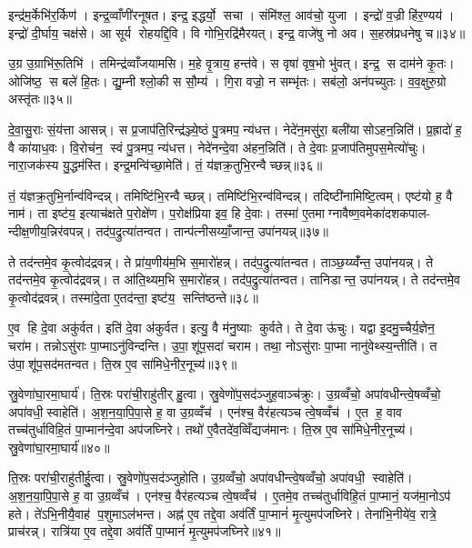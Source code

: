 इन्द्र॑म॒र्केभि॑र॒र्किण॑। इन्द्र॒व्वाँणी॑रनूषत। इन्द्र॒ इद्धर्यो॒ सचा। संमि॑श्ल॒ आव॑चो॒ युजा। इन्द्रो॑ व॒ज्री हि॑र॒ण्यय॑। इन्द्रो॑ दी॒र्घाय॒ चक्ष॑से। आ सूर्य रोहयद्दि॒वि। वि गोभि॒रद्रि॑मैरयत्। इन्द्र॒ वाजे॑षु नो अव। स॒हस्र॑प्रधनेषु च॥३४॥

उ॒ग्र उ॒ग्राभि॑रू॒तिभि॑। तमिन्द्र॑व्वाँजयामसि। म॒हे वृ॒त्राय॒ हन्त॑वे। स वृषा॑ वृष॒भो भु॑वत्। इन्द्र॒ स दाम॑ने कृ॒तः। ओजि॑ष्ठ॒ स बले॑ हि॒तः। द्यु॒म्नी श्लो॒की स सौ॒म्य॑। गि॒रा वज्रो॒ न सम्भृ॑तः। सब॑लो॒ अन॑पच्युतः। व॒व॒क्षुरु॒ग्रो अस्तृ॑तः॥३५॥\anuvakamend[बृ॒हच्चास्तृ॑तः]

दे॒वा॒सु॒राः सं॒य॑त्ता आसन्न्। स प्र॒जाप॑ति॒रिन्द्र॑ञ्ज्ये॒ष्ठं पु॒त्रमप॒ न्य॑धत्त। नेदे॑न॒मसु॑रा॒ बली॑यासोऽहन॒न्निति॑। प्र॒ह्रादो॑ ह॒ वै का॑याध॒वः। वि॒रोच॑न॒ स्वं पु॒त्रमप॒ न्य॑धत्त। नेदे॑नन्दे॒वा अ॑हन॒न्निति॑। ते दे॒वाः प्र॒जाप॑तिमुपस॒मेत्यो॑चुः। नारा॒जक॑स्य यु॒द्धम॑स्ति। इन्द्र॒मन्वि॑च्छा॒मेति॑। तं॒ य॑ज्ञक्र॒तुभि॒रन्वैच्छन्न्॥३६॥

तं॒ य॑ज्ञक्र॒तुभि॒र्नान्व॑विन्दन्न्। तमिष्टि॑भि॒रन्वैच्छन्न्। तमिष्टि॑भि॒रन्व॑विन्दन्न्। तदिष्टी॑नामिष्टि॒त्वम्। एष्ट॑यो ह॒ वै नाम॑। ता इष्ट॑य॒ इत्याच॑क्षते प॒रोक्षे॑ण। प॒रोक्ष॑प्रिया इव॒ हि दे॒वाः। तस्मा॑ ए॒तमाग्नावैष्ण॒वमेका॑दशकपाल- न्दीक्ष॒णीय॒न्निर॑वपन्न्। तद॑प॒द्रुत्या॑तन्वत। तान्प॑त्नीसय्याँ॒जान्त॒ उपा॑नयन्न्॥३७॥

ते तद॑न्तमे॒व कृ॒त्वोद॑द्रवन्न्। ते प्रा॑य॒णीय॑म॒भि स॒मारो॑हन्न्। तद॑प॒द्रुत्या॑तन्वत। ताञ्छ॒य्य्वँ॑न्त॒ उपा॑नयन्न्। ते तद॑न्तमे॒व कृ॒त्वोद॑द्रवन्न्। त आ॑ति॒थ्यम॒भि स॒मारो॑हन्न्। तद॑प॒द्रुत्या॑तन्वत। तानिडान्त॒ उपा॑नयन्न्। ते तद॑न्तमे॒व कृ॒त्वोद॑द्रवन्न्। तस्मा॑दे॒ता ए॒तद॑न्ता॒ इष्ट॑य॒ सन्ति॑ष्ठन्ते॥३८॥

ए॒व हि दे॒वा अकु॑र्वत। इति॑ दे॒वा अ॑कुर्वत। इत्यु॒ वै म॑नु॒ष्याः कुर्वते। ते दे॒वा ऊ॑चुः। यद्वा इ॒दमु॒च्चैर्य॒ज्ञेन॒ चरा॑म। तन्नोऽसु॑राः पा॒प्माऽनु॑विन्दन्ति। उ॒पा॒शू॑प॒सदा॑ चराम। तथा॒ नोऽसु॑राः पा॒प्मा नानु॑वेथ्स्य॒न्तीति॑। त उ॑पा॒शू॑प॒सद॑मतन्वत। ति॒स्र ए॒व सा॑मिधे॒नीर॒नूच्य॑॥३९॥

स्रु॒वेणा॑घा॒रमा॒घार्य॑। ति॒स्रः परा॑ची॒राहु॑तीर् हु॒त्वा। स्रु॒वेणो॑प॒सद॑ञ्जुह॒वाञ्च॑क्रुः। उ॒ग्रव्वँचो॒ अपा॑वधीन्त्वे॒षव्वँचो॒ अपा॑वधी॒स्वाहेति॑। अ॒श॒न॒या॒पि॒पा॒से ह॒ वा उ॒ग्रव्वँच॑। एन॑श्च॒ वैर॑हत्यञ्च त्वे॒षव्वँच॑। ए॒त ह॒ वाव तच्च॑तुर्धाविहि॒तं पा॒प्मान॑न्दे॒वा अप॑जघ्निरे। तथो॑ ए॒वैतदे॑व॒व्विँद्यज॑मानः। ति॒स्र ए॒व सा॑मिधे॒नीर॒नूच्य॑। स्रु॒वेणा॑घा॒रमा॒घार्य॑॥४०॥

ति॒स्रः परा॑ची॒राहु॑तीर्\mbox{}हु॒त्वा। स्रु॒वेणो॑प॒सद॑ञ्जुहोति। उ॒ग्रव्वँचो॒ अपा॑वधीन्त्वे॒षव्वँचो॒ अपा॑वधी॒ स्वाहेति॑। अ॒श॒न॒या॒पि॒पा॒से ह॒ वा उ॒ग्रव्वँच॑। एन॑श्च॒ वैर॑हत्यञ्च त्वे॒षव्वँच॑। ए॒तमे॒व तच्च॑तुर्धाविहि॒तं पा॒प्मानं॒ यज॑मा॒नोऽप॑ हते। ते॑ऽभि॒नीयै॒वाह॑ प॒शुमाऽल॑भन्त। अह्न॑ ए॒व तद्दे॒वा अव॑र्तिं पा॒प्मानं॑ मृ॒त्युमप॑जघ्निरे। तेना॑भि॒नीये॑व॒ रात्रे॒ प्राच॑रन्न्। रात्रि॑या ए॒व तद्दे॒वा अव॑र्तिं पा॒प्मानं॑ मृ॒त्युमप॑जघ्निरे॥४१॥

